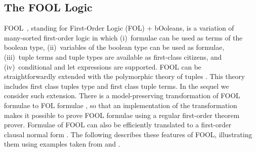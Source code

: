 \documentclass{easychair}
\begin{document}

\subsection{The FOOL Logic}
\label{FOOL}
FOOL~\cite{KKV15}, standing for First-Order Logic (FOL) + bOoleans, is a 
variation of many-sorted first-order logic in which (i)~formulae can
be used as terms of the boolean type, (ii)~variables of the boolean type can
be used as formulae, (iii)~tuple terms and tuple types are available as
first-class citizens, and (iv)~conditional and let expressions are supported.
FOOL can be straightforwardly extended with the polymorphic theory of tuples
\cite{KKV18}. This theory includes first class tuples type and first class tuple
terms. In the sequel we consider such extension.
There is a model-preserving transformation of FOOL formulae to FOL formulae
\cite{KKV15}, so that an implementation of the transformation makes it 
possible to prove FOOL formulae using a regular first-order theorem prover. 
Formulae of FOOL can also be efficiently translated to a first-order clausal 
normal form \cite{KK+16-GCAI}.
The following describes these features of FOOL, illustrating
them using examples taken from \cite{KK+16} and \cite{KKV18}.
\end{document}
